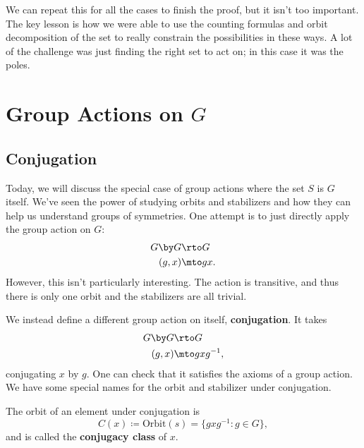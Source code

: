 We can repeat this for all the cases to finish the proof, but it isn't too important. 
The key lesson is how we were able to use the counting formulas and orbit decomposition of the set to really constrain the possibilities in these ways.
A lot of the challenge was just finding the right set to act on; in this case it was the poles. 

\newpage


\section{Group Actions on $G$}
\subsection{Conjugation}
Today, we will discuss the special case of group actions where the set $S$ is $G$ itself. 
We've seen the power of studying orbits and stabilizers and how they can help us understand groups of symmetries. 
One attempt is to just directly apply the group action on $G$:
\begin{align*}
    G \by G &\rto G \\
    (g, x) &\mto gx.
\end{align*}
However, this isn't particularly interesting. The action is transitive, and thus there is only one orbit and the stabilizers are all trivial. 

We instead define a different group action on itself, \textbf{conjugation}. It takes 
\begin{align*}
    G \by G &\rto G \\
    (g, x) &\mto gxg^{-1},
\end{align*}
conjugating $x$ by $g.$ 
One can check that it satisfies the axioms of a group action. %
We have some special names for the orbit and stabilizer under conjugation.
\begin{definition}
The orbit of an element under conjugation is 
\[C(x) \coloneqq \text{Orbit}(s) = \{gxg^{-1}: g \in G\},\]
and is called the \textbf{conjugacy class} of $x.$
\end{definition}

